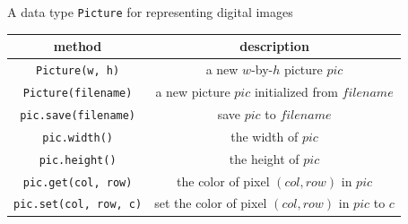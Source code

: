 \documentclass[8pt,a4paper,compress]{beamer}
\begin{document}
\begin{frame}[fragile]
\pause

A data type \lstinline{Picture} for representing digital images
\begin{center}
\begin{tabular}{cc}
method & description \\ \hline
\lstinline$Picture(w, h)$ & a new $w$-by-$h$ picture $pic$ \\
\lstinline$Picture(filename)$ & a new picture $pic$ initialized from $filename$ \\
\lstinline$pic.save(filename)$ & save $pic$ to $filename$ \\
\lstinline$pic.width()$ & the width of $pic$ \\
\lstinline$pic.height()$ & the height of $pic$ \\
\lstinline$pic.get(col, row)$ & the color of pixel $(col, row)$ in $pic$ \\
\lstinline$pic.set(col, row, c)$ & set the color of pixel $(col, row)$ in $pic$ to $c$
\end{tabular} 
\end{center}
\end{frame}
\end{document}
